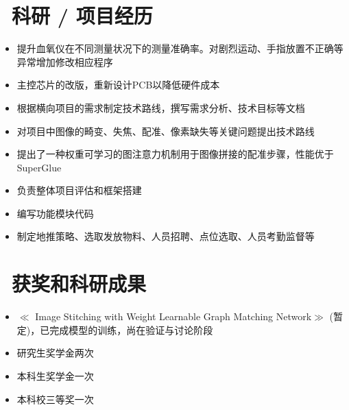 \documentclass{resume}
\begin{document}
\section{\faUsers\ 科研 / 项目经历}

\begin{itemize}
\item  提升血氧仪在不同测量状况下的测量准确率。对剧烈运动、手指放置不正确等异常增加修改相应程序
\item  主控芯片的改版，重新设计PCB以降低硬件成本
\end{itemize}

\begin{itemize}
\item  根据横向项目的需求制定技术路线，撰写需求分析、技术目标等文档
\item  对项目中图像的畸变、失焦、配准、像素缺失等关键问题提出技术路线
\item  提出了一种权重可学习的图注意力机制用于图像拼接的配准步骤，性能优于SuperGlue
\end{itemize}

\begin{itemize}
  \item 负责整体项目评估和框架搭建
  \item 编写功能模块代码
\end{itemize}

\begin{itemize}
  \item 制定地推策略、选取发放物料、人员招聘、点位选取、人员考勤监督等
\end{itemize}


\section{\faPaperPlane\ 获奖和科研成果}
\hspace*{0.8cm}
\begin{itemize}
  \item $\ll$ Image Stitching with Weight Learnable Graph Matching Network$\gg$ (暂定)，已完成模型的训练，尚在验证与讨论阶段
  \item 研究生奖学金两次
  \item 本科生奖学金一次
  \item 本科校三等奖一次
\end{itemize}



%
%
\end{document}
